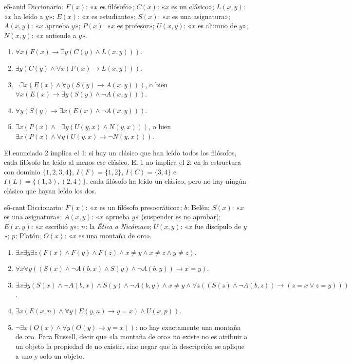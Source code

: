 \begin{solucion}{e5-anid}
Diccionario: $F(x)$: «$x$ es filósofo»; $C(x)$: «$x$ es un clásico»; $L(x, y)$: «$x$ ha leído a $y$»; $E(x)$: «$x$ es estudiante»; $S(x)$: «$x$ es una asignatura»; $A(x, y)$: «$x$ aprueba $y$»; $P(x)$: «$x$ es profesor»; $U(x, y)$: «$x$ es alumno de $y$»; $N(x, y)$: «$x$ entiende a $y$».
\begin{enumerate}
    \item $\forall x (F(x) \to \exists y (C(y) \land L(x, y)))$.
    \item $\exists y (C(y) \land \forall x (F(x) \to L(x, y)))$.
    \item $\neg \exists x (E(x) \land \forall y (S(y) \to A(x, y)))$, o bien $\forall x (E(x) \to \exists y (S(y) \land \neg A(x, y)))$.
    \item $\forall y (S(y) \to \exists x (E(x) \land \neg A(x, y)))$.
    \item $\exists x (P(x) \land \neg \exists y (U(y, x) \land N(y, x)))$, o bien $\exists x (P(x) \land \forall y (U(y, x) \to \neg N(y, x)))$.
\end{enumerate}
El enunciado 2 implica el 1: si hay un clásico que han leído todos los filósofos, cada filósofo ha leído al menos ese clásico. El 1 no implica el 2: en la estructura con dominio $\{1, 2, 3, 4\}$, $I(F) = \{1, 2\}$, $I(C) = \{3, 4\}$ e $I(L) = \{(1, 3), (2, 4)\}$, cada filósofo ha leído un clásico, pero no hay ningún clásico que hayan leído los dos.
\end{solucion}

\begin{solucion}{e5-cant}
Diccionario: $F(x)$: «$x$ es un filósofo presocrático»; $b$: Belén; $S(x)$: «$x$ es una asignatura»; $A(x, y)$: «$x$ aprueba $y$» (suspender es no aprobar); $E(x, y)$: «$x$ escribió $y$»; $n$: la \emph{Ética a Nicómaco}; $U(x, y)$: «$x$ fue discípulo de $y$»; $p$: Platón; $O(x)$: «$x$ es una montaña de oro».
\begin{enumerate}
    \item $\exists x \exists y \exists z (F(x) \land F(y) \land F(z) \land x \neq y \land x \neq z \land y \neq z)$.
    \item $\forall x \forall y ((S(x) \land \neg A(b, x) \land S(y) \land \neg A(b, y)) \to x = y)$.
    \item $\exists x \exists y (S(x) \land \neg A(b, x) \land S(y) \land \neg A(b, y) \land x \neq y \land \forall z ((S(z) \land \neg A(b, z)) \to (z = x \lor z = y)))$.
    \item $\exists x (E(x, n) \land \forall y (E(y, n) \to y = x) \land U(x, p))$.
    \item $\neg \exists x (O(x) \land \forall y (O(y) \to y = x))$: no hay exactamente una montaña de oro. Para Russell, decir que «la montaña de oro» no existe no es atribuir a un objeto la propiedad de no existir, sino negar que la descripción se aplique a uno y solo un objeto.
\end{enumerate}
\end{solucion}

